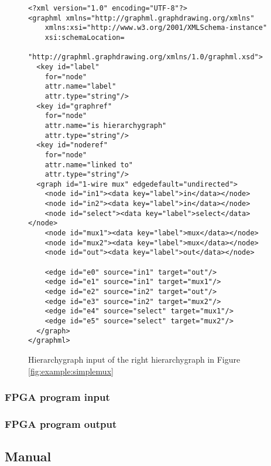 \begin{figure}[h]
\centering
\begin{lstlisting}[frame=single,  basicstyle=\scriptsize]
<?xml version="1.0" encoding="UTF-8"?>
<graphml xmlns="http://graphml.graphdrawing.org/xmlns"  
    xmlns:xsi="http://www.w3.org/2001/XMLSchema-instance"
    xsi:schemaLocation=
    "http://graphml.graphdrawing.org/xmlns/1.0/graphml.xsd">
  <key id="label"
    for="node"
    attr.name="label"
    attr.type="string"/>
  <key id="graphref"
    for="node"
    attr.name="is hierarchygraph"
    attr.type="string"/>
  <key id="noderef"
    for="node"
    attr.name="linked to"
    attr.type="string"/>
  <graph id="1-wire mux" edgedefault="undirected">
    <node id="in1"><data key="label">in</data></node>
    <node id="in2"><data key="label">in</data></node>
    <node id="select"><data key="label">select</data></node>
    <node id="mux1"><data key="label">mux</data></node>
    <node id="mux2"><data key="label">mux</data></node>
    <node id="out"><data key="label">out</data></node>
   
    <edge id="e0" source="in1" target="out"/>
    <edge id="e1" source="in1" target="mux1"/>
    <edge id="e2" source="in2" target="out"/>
    <edge id="e3" source="in2" target="mux2"/>
    <edge id="e4" source="select" target="mux1"/>
    <edge id="e5" source="select" target="mux2"/>
  </graph>
</graphml>
\end{lstlisting}
\caption{Hierarchygraph input of the right hierarchygraph in Figure \ref{fig:example:simplemux}}
\label{fig:example:simplemuxListing2}
\end{figure}
\subsubsection{FPGA program input}
\subsubsection{FPGA program output}

\subsection{Manual}